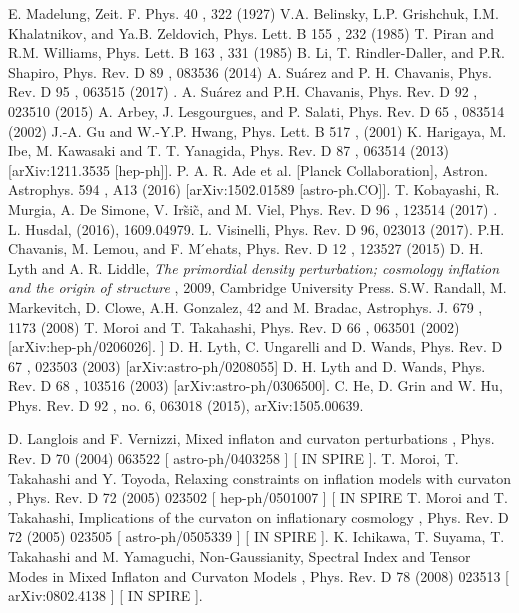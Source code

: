 \documentclass[amssymb,twocolumn,prd,nofootinbib,showpacs]{revtex4-1}
\begin{document}
\begin{thebibliography}{9}
%
%
%


  E. Madelung, Zeit. F. Phys.
40
, 322 (1927)
  V.A.  Belinsky,  L.P.  Grishchuk,  I.M.  Khalatnikov,  and
Ya.B. Zeldovich, Phys. Lett. B
155
, 232 (1985)
  T.  Piran  and  R.M.  Williams,  Phys.  Lett.  B
163
,  331
(1985)
  B. Li, T. Rindler-Daller, and P.R. Shapiro, Phys. Rev.
D
89
, 083536 (2014)
 A. Su\'arez and P. H. Chavanis,
Phys. Rev. D
95
, 063515
(2017)
.
 A. Su\'arez and P.H. Chavanis, Phys. Rev. D
92
, 023510
(2015)
  A. Arbey, J. Lesgourgues, and P. Salati, Phys. Rev. D
65
, 083514 (2002)
  J.-A.  Gu  and  W.-Y.P.  Hwang,  Phys.  Lett.  B
517
,
(2001)
     K. Harigaya, M. Ibe, M. Kawasaki and T. T. Yanagida, Phys. Rev. D
87
, 063514
(2013) [arXiv:1211.3535 [hep-ph]].
  P.   A.   R.   Ade
et   al.
[Planck   Collaboration],    Astron.   Astrophys.
594
,    A13   (2016)
[arXiv:1502.01589 [astro-ph.CO]].
T. Kobayashi, R. Murgia, A. De Simone, V. Ir\~si\~c, and M.
Viel,
Phys. Rev. D
96
, 123514 (2017)
.
L. Husdal, (2016), 1609.04979.
L. Visinelli,
Phys. Rev. D 96, 023013 (2017).
  P.H. Chavanis, M. Lemou, and F. M ́ehats, Phys. Rev.
D
12
, 123527 (2015)
D. H. Lyth and A. R. Liddle, \textit{The primordial density perturbation; cosmology inflation and the origin of structure} , 2009, Cambridge University Press.
  S.W. Randall, M. Markevitch, D. Clowe, A.H. Gonzalez,
42
and M. Bradac, Astrophys. J.
679
, 1173 (2008)
T. Moroi and T. Takahashi, Phys. Rev. D
66
, 063501 (2002) [arXiv:hep-ph/0206026].
] D. H. Lyth, C. Ungarelli and D. Wands, Phys. Rev. D
67
, 023503 (2003)
[arXiv:astro-ph/0208055]
 D. H. Lyth and D. Wands, Phys. Rev. D
68
, 103516 (2003) [arXiv:astro-ph/0306500].
 C.  He,  D.  Grin  and  W.  Hu,  Phys.  Rev.  D
92
,  no.  6,
063018 (2015), arXiv:1505.00639.

 D. Langlois and F. Vernizzi,
Mixed inflaton and curvaton perturbations
,
Phys. Rev.
D 70
(2004) 063522
[
astro-ph/0403258
] [
IN
SPIRE
].
 T. Moroi, T. Takahashi and Y. Toyoda,
Relaxing constraints on inflation models with curvaton
,
Phys. Rev.
D 72
(2005) 023502
[
hep-ph/0501007
] [
IN
SPIRE
 T. Moroi and T. Takahashi,
Implications of the curvaton on inflationary cosmology
,
Phys. Rev.
D 72
(2005) 023505
[
astro-ph/0505339
] [
IN
SPIRE
].
 K. Ichikawa, T. Suyama, T. Takahashi and M. Yamaguchi,
Non-Gaussianity, Spectral Index
and Tensor Modes in Mixed Inflaton and Curvaton Models
,
Phys. Rev.
D 78
(2008) 023513
[
arXiv:0802.4138
] [
IN
SPIRE
].


\end{thebibliography}
\end{document}
